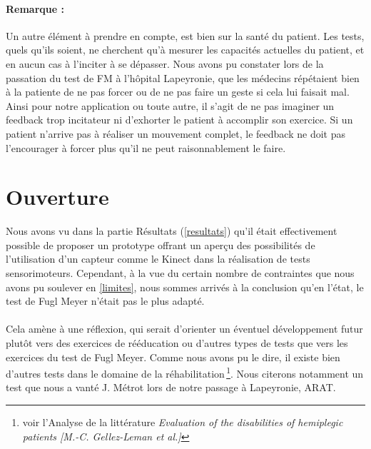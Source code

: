 \documentclass[french,12pt]{report}
\begin{document}
\paragraph{Remarque :\\}
Un autre élément à prendre en compte, est bien sur la santé du patient. Les tests, quels qu'ils soient, ne cherchent qu'à mesurer
les capacités actuelles du patient, et en aucun cas à l'inciter à se dépasser. Nous avons pu constater lors de la passation
du test de FM à l'hôpital Lapeyronie, que les médecins répétaient bien à la patiente de ne pas forcer ou de ne pas faire un geste
si cela lui faisait mal.\\
Ainsi pour notre application ou toute autre, il s'agit de ne pas imaginer un feedback trop incitateur ni d'exhorter le patient à 
accomplir son exercice. Si un patient n'arrive pas à réaliser un mouvement complet, le feedback ne doit pas l'encourager à forcer plus qu’il ne peut raisonnablement le faire.
		
		\section{Ouverture}	%
Nous avons vu dans la partie Résultats (\ref{resultats}) qu'il était effectivement possible de proposer un prototype offrant un aperçu des possibilités de l'utilisation d'un capteur comme le Kinect dans la réalisation de tests sensorimoteurs. Cependant, à la vue du certain nombre de contraintes que nous avons pu soulever en \ref{limites}, nous sommes arrivés à la conclusion qu'en l'état, le test de Fugl Meyer n'était pas le plus adapté. 

\paragraph{}
Cela amène à une réflexion, qui serait d'orienter un éventuel développement futur plutôt vers des exercices de rééducation ou d'autres types de tests que vers les exercices du test de Fugl Meyer. Comme nous avons pu le dire, il existe bien d'autres tests 
dans le domaine de la réhabilitation\,\footnote{voir l'Analyse de la littérature \textit{Evaluation of the disabilities of hemiplegic patients [M.-C. Gellez-Leman et al.]}}. Nous citerons notamment un test que nous a vanté J. Métrot lors de notre passage à 
Lapeyronie, ARAT.
\end{document}
